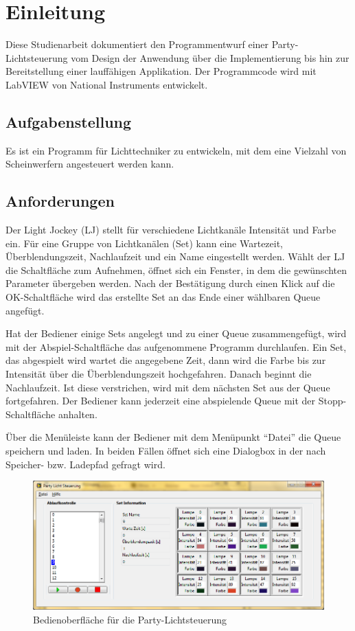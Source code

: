 \section{Einleitung}%

Diese Studienarbeit dokumentiert den Programmentwurf einer Party-Lichtsteuerung vom Design der Anwendung über die Implementierung bis hin zur Bereitstellung einer lauffähigen Applikation.
Der Programmcode wird mit LabVIEW von National Instruments entwickelt.

\subsection{Aufgabenstellung}
Es ist ein Programm für Lichttechniker zu entwickeln, mit dem eine Vielzahl von Scheinwerfern angesteuert werden kann. 

\subsection{Anforderungen}
Der Light Jockey (LJ) stellt für verschiedene Lichtkanäle Intensität und Farbe ein. 
Für eine Gruppe von Lichtkanälen (Set) kann eine Wartezeit, Überblendungszeit, Nachlaufzeit und ein Name eingestellt werden. 
Wählt der LJ die Schaltfläche zum Aufnehmen, öffnet sich ein Fenster, in dem die gewünschten Parameter übergeben werden. 
Nach der Bestätigung durch einen Klick auf die OK-Schaltfläche wird das erstellte Set an das Ende einer wählbaren Queue angefügt.

Hat der Bediener einige Sets angelegt und zu einer Queue zusammengefügt, wird mit der Abspiel-Schaltfläche das aufgenommene Programm durchlaufen. 
Ein Set, das abgespielt wird wartet die angegebene Zeit, dann wird die Farbe bis zur Intensität über die Überblendungszeit hochgefahren. 
Danach beginnt die Nachlaufzeit.
Ist diese verstrichen, wird mit dem nächsten Set aus der Queue fortgefahren. 
Der Bediener kann jederzeit eine abspielende Queue mit der Stopp-Schaltfläche anhalten.

Über die Menüleiste kann der Bediener mit dem Menüpunkt "`Datei"' die Queue speichern und laden. 
In beiden Fällen öffnet sich eine Dialogbox in der nach Speicher- bzw. Ladepfad gefragt wird.

	\begin{figure}%
	\centering
		\includegraphics[width=\textwidth]{Pics/Oberflaeche001.png}
	\caption{Bedienoberfläche für die Party-Lichtsteuerung}
	\label{fig:ober001}
	\end{figure}



